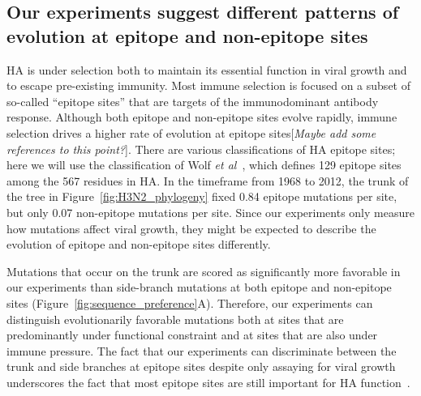 \documentclass[9pt,twocolumn,twoside]{pnas-new}
\newcommand{\comment}[1]{{\color{red}[\textsl{#1}]}}
\begin{document}
\subsection*{Our experiments suggest different patterns of evolution at epitope and non-epitope sites}
HA is under selection both to maintain its essential function in viral growth and to escape pre-existing immunity.
Most immune selection is focused on a subset of so-called ``epitope sites'' that are targets of the immunodominant antibody response.
Although both epitope and non-epitope sites evolve rapidly, immune selection drives a higher rate of evolution at epitope sites\comment{Maybe add some references to this point?}.
There are various classifications of HA epitope sites; here we will use the classification of Wolf \textit{et al}~\cite{wolf2006long}, which defines 129 epitope sites among the 567 residues in HA.
In the timeframe from 1968 to 2012, the trunk of the tree in Figure~\ref{fig:H3N2_phylogeny} fixed 0.84 epitope mutations per site, but only 0.07 non-epitope mutations per site.
Since our experiments only measure how mutations affect viral growth, they might be expected to describe the evolution of epitope and non-epitope sites differently.

Mutations that occur on the trunk are scored as significantly more favorable in our experiments than side-branch mutations at both epitope and non-epitope sites (Figure~\ref{fig:sequence_preference}A).
Therefore, our experiments can distinguish evolutionarily favorable mutations both at sites that are predominantly under functional constraint and at sites that are also under immune pressure.
The fact that our experiments can discriminate between the trunk and side branches at epitope sites despite only assaying for viral growth underscores the fact that most epitope sites are still important for HA function~\cite{nakajima2003restriction,das2013defining,koel2013substitutions}. 
\end{document}
